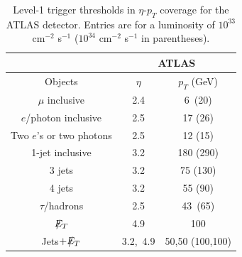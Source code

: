 \documentclass[12pt,prd,aps,floats,preprintnumbers,preprint,superscriptaddress,floatfix,nofootinbib]{revtex4}
\newcommand{ \slashchar }[1]{\setbox0=\hbox{$#1$}   %
   \dimen0=\wd0                                     %
   \setbox1=\hbox{/} \dimen1=\wd1                   %
   \ifdim\dimen0>\dimen1                            %
      \rlap{\hbox to \dimen0{\hfil/\hfil}}          %
      #1                                            %
   \else                                            %
      \rlap{\hbox to \dimen1{\hfil$#1$\hfil}}       %
      /                                             %
   \fi}                                             %
\def\etmiss{\slashchar{E}_{T}}
\def\pt{p_T^{}}
\begin{document}
%
%
\begin{table}[tb]
\begin{tabular}{|c|c c | } 
\hline
\multicolumn{1}{|c|}{ }&
\multicolumn{2}{c|}{ATLAS} \\
\hline
  Objects & $\eta$   & $\pt$ (GeV)  \\
\hline\hline
$\mu$ inclusive  &  2.4 &  6\ (20)     \\
\hline
$e$/photon inclusive & 2.5 &   17  (26) \\
Two $e$'s or two photons & 2.5 & 12 (15)    \\
\hline
1-jet inclusive  & 3.2  & 180 (290)  \\
3 jets  & 3.2  &    75 (130) \\
4 jets  & 3.2  &   55 (90)  \\
$\tau$/hadrons  & 2.5 & 43\ (65)   \\
\hline
$\etmiss$ & 4.9  & 100   \\
Jets$+\etmiss$ & 3.2,\ 4.9 & 50,50 (100,100)  \\
\hline
\end{tabular}
\caption{Level-1 trigger thresholds in $\eta$-$\pt$ coverage 
for the ATLAS  {\protect\cite{ATLAS}} detector.
Entries are for a luminosity of $10^{33}$ cm$^{-2}$ s$^{-1}$
($10^{34}$ cm$^{-2}$ s$^{-1}$ in parentheses). }
\label{trigger} 
\end{table}
\end{document}
